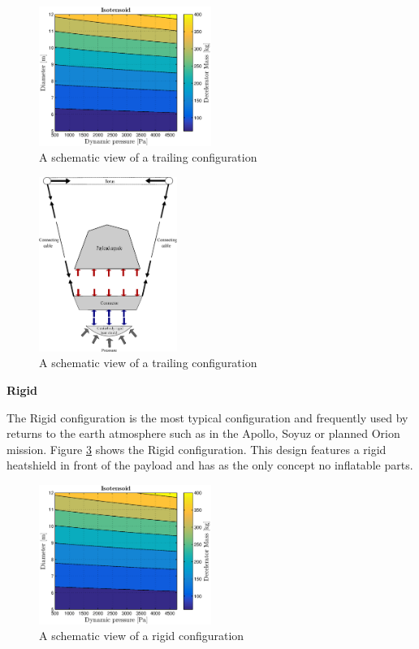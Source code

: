 \begin{figure}[H]
\centering
\includegraphics[width = 0.5\textwidth]{Figure/ISO_comp.eps}
\caption{A schematic view of a trailing configuration}
\label{fig:conc_trailing}
\end{figure}

\begin{figure}[H]
\centering
\includegraphics[width = 0.4\textwidth]{Figure/FBD_trailing.eps}
\caption{A schematic view of a trailing configuration}
\label{fig:fbd_trailing}
\end{figure}

\textbf{Rigid}

The Rigid configuration is the most typical configuration and frequently used by returns to the earth atmosphere such as in the Apollo, Soyuz or planned Orion mission. Figure \ref{fig:conc_rigid} shows the Rigid configuration. This design features a rigid heatshield in front of the payload and has as the only concept no inflatable parts.

\begin{figure}[H]
\centering
\includegraphics[width = 0.5\textwidth]{Figure/ISO_comp.eps}
\caption{A schematic view of a rigid configuration}
\label{fig:conc_rigid}
\end{figure}

